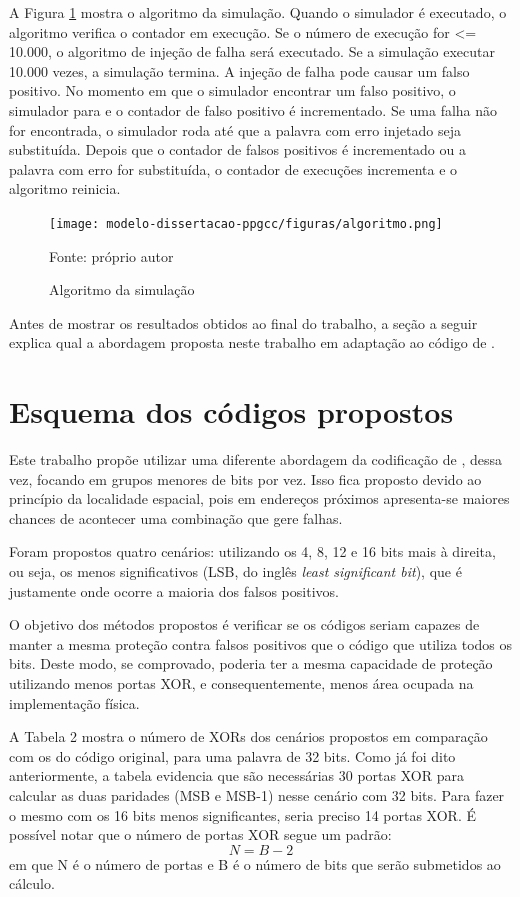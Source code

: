 A Figura \ref{fig:algoritmo} mostra o algoritmo da simulação. Quando o simulador é executado, o algoritmo verifica o contador em execução. Se o número de execução for <= 10.000, o algoritmo de injeção de falha será executado. Se a simulação executar 10.000 vezes, a simulação termina. A injeção de falha pode causar um falso positivo. No momento em que o simulador encontrar um falso positivo, o simulador para e o contador de falso positivo é incrementado. Se uma falha não for encontrada, o simulador roda até que a palavra com erro injetado seja substituída. Depois que o contador de falsos positivos é incrementado ou a palavra com erro for substituída, o contador de execuções incrementa e o algoritmo reinicia.

\begin{figure}[ht]
    \centering
    \texttt{[image: modelo-dissertacao-ppgcc/figuras/algoritmo.png]}
    \caption{Algoritmo da simulação}{Fonte: próprio autor}
    \label{fig:algoritmo}
\end{figure}

Antes de mostrar os resultados obtidos ao final do trabalho, a seção a seguir explica qual a abordagem proposta neste trabalho em adaptação ao código de \cite{sanchez2019reducing}.

\section{Esquema dos códigos propostos}
Este trabalho propõe utilizar uma diferente abordagem da codificação de \cite{sanchez2019reducing}, dessa vez, focando em grupos menores de bits por vez. Isso fica proposto devido ao princípio da localidade espacial, pois em endereços próximos apresenta-se maiores chances de acontecer uma combinação que gere falhas.

Foram propostos quatro cenários: utilizando os 4, 8, 12 e 16 bits mais à direita, ou seja, os menos significativos (LSB, do inglês \textit{least significant bit}), que é justamente onde ocorre a maioria dos falsos positivos.

O objetivo dos métodos propostos é verificar se os códigos seriam capazes de manter a mesma proteção contra falsos positivos que o código que utiliza todos os bits. Deste modo, se comprovado, poderia ter a mesma capacidade de proteção utilizando menos portas XOR, e consequentemente, menos área ocupada na implementação física. 

A Tabela 2 mostra o número de XORs dos cenários propostos em comparação com os do código original, para uma palavra de 32 bits. Como já foi dito anteriormente, a tabela evidencia que são necessárias 30 portas XOR para calcular as duas paridades (MSB e MSB-1) nesse cenário com 32 bits. Para fazer o mesmo com os 16 bits menos significantes, seria preciso 14 portas XOR. É possível notar que o número de portas XOR segue um padrão:
\begin{equation}
    N = B-2
\end{equation}
em que N é o número de portas e B é o número de bits que serão submetidos ao cálculo.

